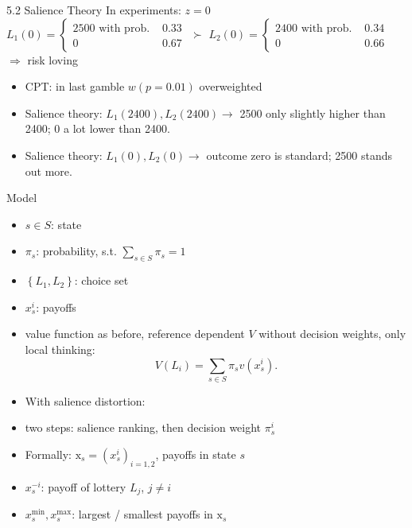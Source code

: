 \documentclass[11pt,aspectratio=169]{beamer}
\begin{document}
\begin{frame}{5.2 Salience Theory}
In experiments: $z=0$ \\
$L_1(0)= \begin{cases} 2500 \text { with prob. } & 0.33 \\ 0 & 0.67 \end{cases}$ $\succ$
$L_2(0) = \begin{cases} 2400 \text { with prob. } & 0.34 \\ 0 & 0.66\end{cases}$\\

$\Rightarrow$ risk loving

\begin{itemize}
    \item CPT: in last gamble $w(p=0.01)$ overweighted\medskip
    \item Salience theory: $L_1(2400),L_2(2400) \rightarrow$ 2500 only slightly higher than 2400; 0 a lot lower than 2400.\medskip
    \item Salience theory: $L_1(0),L_2(0) \rightarrow$ outcome zero is standard; 2500 stands out more.\medskip 
\end{itemize}
\end{frame}

\begin{frame}{Model}
    \begin{itemize}
        \item $s \in S$: state\medskip
        \item $\pi_s$: probability, s.t. $\sum_{s \in S} \pi_s=1$\medskip
        \item $\left\{L_1, L_2\right\}$: choice set\medskip
        \item $x_s^i$: payoffs\medskip
        \item value function as before, reference dependent $V$ without decision weights, only local thinking:\medskip
        $$
    V\left(L_i\right)=\sum_{s \in S} \pi_s v\left(x_s^i\right) .
    $$
        \item With salience distortion:\medskip
        \item two steps: salience ranking, then decision weight $\pi_s^i$\medskip
        \item Formally: $\mathrm{x}_s=\left(x_s^i\right)_{i=1,2}$, payoffs in state $s$\medskip
        \item $x_s^{-i}$: payoff of lottery $L_j$, $j \neq i$\medskip
        \item $x_s^{\min }, x_s^{\max }$: largest / smallest payoffs in $\mathrm{x}_s$
	\end{itemize}
\end{frame}
\end{document}
